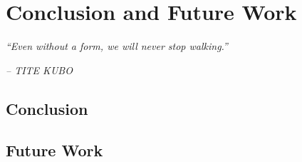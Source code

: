 \chapter{Conclusion and Future Work} \label{cap:conclusao}

\begin{displayquote}
    \begin{center}
        \textit{``Even without a form, we will never stop walking.''}
    \end{center}
\end{displayquote}

\begin{flushright}
   \textit{-- TITE KUBO}
\end{flushright}

\section{Conclusion}

\section{Future Work}

